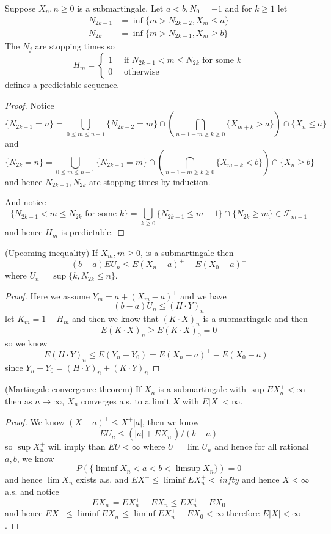 \documentclass[lang=en, color=blue, ]{elegantbook}
\newcommand{\F}{\mathcal{F}}
\begin{document}
\begin{definition}
    Suppose $X_n, n\geq 0$ is a submartingale. Let $a<b, N_0 = -1$ and for $k\geq 1$ let
    \[
    \begin{aligned}
        N_{2k-1} &= \inf\{m>N_{2k-2},X_m\leq a\} \\
        N_{2k} &= \inf\{m>N_{2k-1}, X_m \geq b\}
    \end{aligned}
    \] 
    The $N_j$ are stopping times so
    \[
    H_m = \begin{cases}
        1\quad\text{ if }N_{2k-1}<m\leq N_{2k}\text{ for some }k\\
        0\quad\text{ otherwise}
    \end{cases}
    \]
    defines a predictable sequence.
\end{definition}
\begin{proof}\par
    Notice
    \[\{N_{2k-1} = n\} = \bigcup_{0\leq m \leq n-1}\{N_{2k-2} = m\}\cap(\bigcap_{ n-1-m\geq k\geq 0}\{X_{m+k} > a\})\cap\{X_n \leq a\}\]
    and
    \[
    \{N_{2k} = n\} = \bigcup_{0\leq m \leq n-1}\{N_{2k-1} = m\}\cap(\bigcap_{ n-1-m\geq k\geq 0}\{X_{m+k} < b\})\cap\{X_n \geq b\}
    \]
    and hence $N_{2k-1},N_{2k}$ are stopping times by induction.\par
    And notice
    \[
    \{N_{2k-1}<m\leq N_{2k}\text{ for some }k\} = \bigcup_{k\geq 0} \{N_{2k-1} \leq m-1\}\cap\{N_{2k}\geq m\} \in \F_{m-1}
    \]
    and hence $H_m$ is predictable.
\end{proof}

\begin{theorem}
    (Upcoming inequality) If $X_m,m\geq 0$, is a submartingale then
    \[(b-a)EU_n \leq E(X_n-a)^+ - E(X_0-a)^+\]
    where $U_n = \sup\{k, N_{2k} \leq n\}$.
\end{theorem}
\begin{proof}
    Here we assume $Y_m = a+(X_m-a)^+$ and we have
    \[
    (b-a)U_n \leq (H\cdot Y)_n
    \]
    let $K_m = 1-H_m$ and then we know that $(K\cdot X)_n$ is a submartingale and then
    \[E(K\cdot X)_n \geq E(K\cdot X)_0 = 0\]
    so we know
    \[E(H\cdot Y)_n \leq E(Y_n-Y_0) = E(X_n-a)^+ - E(X_0-a)^+\]
    since $Y_n-Y_0 = (H\cdot Y)_n + (K\cdot Y)_n$
\end{proof}

\begin{theorem}
    (Martingale convergence theorem) If $X_n$ is a submartingale with $\sup EX_n^+ < \infty$ then as $n\to\infty$, $X_n$ converges a.s. to a limit $X$ with $E|X|<\infty$.
\end{theorem}
\begin{proof}
    We know $(X-a)^+ \leq X^+ |a|$, then we know
    \[EU_n \leq (|a|+EX_n^+)/(b-a)\]
    so $\sup X_n^+$ will imply than $EU < \infty$ where $U = \lim U_n$ and hence for all rational $a,b$, we know
    \[P(\{\liminf X_n < a < b < \limsup X_n\}) = 0\]
    and hence $\lim X_n$ exists a.s. and $EX^+ \leq \liminf EX_n^+ <\ infty$ and hence $X<\infty$ a.s. and notice
    \[EX_n^- = EX_n^+ - EX_n \leq EX_n^+ - EX_0\]
    and hence $EX^- \leq \liminf EX_n^- \leq \liminf EX_n^+ - EX_0 < \infty$
    therefore $E|X|<\infty$. 
\end{proof}
\end{document}
